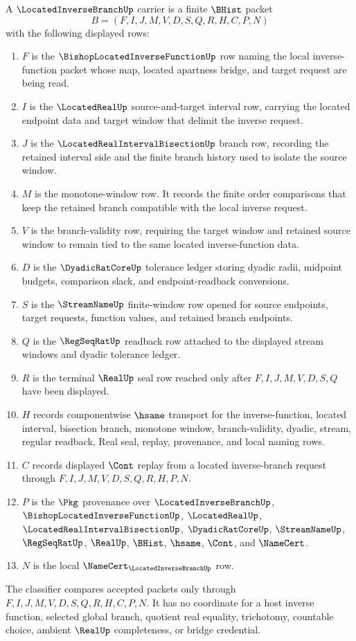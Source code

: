 \begin{definition}
\label{def:located-inverse-branch-carrier}
A $\LocatedInverseBranchUp$ carrier is a finite $\BHist$ packet
$$
B=(F,I,J,M,V,D,S,Q,R,H,C,P,N)
$$
with the following displayed rows:
\begin{enumerate}
\item $F$ is the $\BishopLocatedInverseFunctionUp$ row naming the local inverse-function packet whose map, located apartness bridge, and target request are being read.
\item $I$ is the $\LocatedRealUp$ source-and-target interval row, carrying the located endpoint data and target window that delimit the inverse request.
\item $J$ is the $\LocatedRealIntervalBisectionUp$ branch row, recording the retained interval side and the finite branch history used to isolate the source window.
\item $M$ is the monotone-window row. It records the finite order comparisons that keep the retained branch compatible with the local inverse request.
\item $V$ is the branch-validity row, requiring the target window and retained source window to remain tied to the same located inverse-function data.
\item $D$ is the $\DyadicRatCoreUp$ tolerance ledger storing dyadic radii, midpoint budgets, comparison slack, and endpoint-readback conversions.
\item $S$ is the $\StreamNameUp$ finite-window row opened for source endpoints, target requests, function values, and retained branch endpoints.
\item $Q$ is the $\RegSeqRatUp$ readback row attached to the displayed stream windows and dyadic tolerance ledger.
\item $R$ is the terminal $\RealUp$ seal row reached only after $F,I,J,M,V,D,S,Q$ have been displayed.
\item $H$ records componentwise $\hsame$ transport for the inverse-function, located interval, bisection branch, monotone window, branch-validity, dyadic, stream, regular readback, Real seal, replay, provenance, and local naming rows.
\item $C$ records displayed $\Cont$ replay from a located inverse-branch request through $F,I,J,M,V,D,S,Q,R,H,P,N$.
\item $P$ is the $\Pkg$ provenance over $\LocatedInverseBranchUp$, $\BishopLocatedInverseFunctionUp$, $\LocatedRealUp$, $\LocatedRealIntervalBisectionUp$, $\DyadicRatCoreUp$, $\StreamNameUp$, $\RegSeqRatUp$, $\RealUp$, $\BHist$, $\hsame$, $\Cont$, and $\NameCert$.
\item $N$ is the local $\NameCert_{\LocatedInverseBranchUp}$ row.
\end{enumerate}
The classifier compares accepted packets only through $F,I,J,M,V,D,S,Q,R,H,C,P,N$. It has no coordinate for a host inverse function, selected global branch, quotient real equality, trichotomy, countable choice, ambient $\RealUp$ completeness, or bridge credential.
\end{definition}

